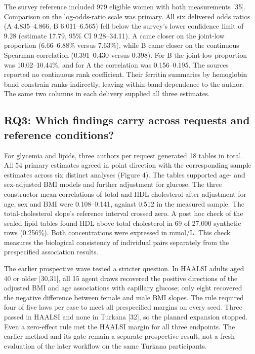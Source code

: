 \documentclass[sigconf,review]{acmart}
\begin{document}
The survey reference included 979 eligible women with both measurements [35]. Comparison on the log-odds-ratio scale was primary. All six delivered odds ratios (A 4.835–\allowbreak{}4.866, B 6.011–\allowbreak{}6.565) fell below the survey's lower confidence limit of 9.28 (estimate 17.79, 95\% CI 9.28–\allowbreak{}34.11). A came closer on the joint-low proportion (6.66–\allowbreak{}6.88\% versus 7.63\%), while B came closer on the continuous Spearman correlation (0.391–\allowbreak{}0.430 versus 0.398). For B the joint-low proportion was 10.02–\allowbreak{}10.44\%, and for A the correlation was 0.156–\allowbreak{}0.195. The sources reported no continuous rank coefficient. Their ferritin summaries by hemoglobin band constrain ranks indirectly, leaving within-band dependence to the author. The same two columns in each delivery supplied all three estimates.


\subsection{RQ3: Which findings carry across requests and reference conditions?}

For glycemia and lipids, three authors per request generated 18 tables in total. All 54 primary estimates agreed in point direction with the corresponding sample estimates across six distinct analyses (Figure 4). The tables supported age- and sex-adjusted BMI models and further adjustment for glucose. The three constructor-mean correlations of total and HDL cholesterol after adjustment for age, sex and BMI were 0.108–\allowbreak{}0.141, against 0.512 in the measured sample. The total-cholesterol slope's reference interval crossed zero. A post hoc check of the sealed lipid tables found HDL above total cholesterol in 69 of 27,000 synthetic rows (0.256\%). Both concentrations were expressed in mmol/\allowbreak{}L. This check measures the biological consistency of individual pairs separately from the prespecified association results.


The earlier prospective wave tested a stricter question. In HAALSI adults aged 40 or older [30,31], all 15 agent draws recovered the positive directions of the adjusted BMI and age associations with capillary glucose; only eight recovered the negative difference between female and male BMI slopes. The rule required four of five laws per case to meet all prespecified margins on every seed. Three passed in HAALSI and none in Turkana [32], so the planned expansion stopped. Even a zero-effect rule met the HAALSI margin for all three endpoints. The earlier method and its gate remain a separate prospective result, not a fresh evaluation of the later workflow on the same Turkana participants.
\end{document}
